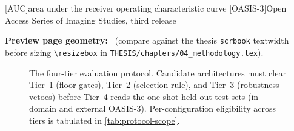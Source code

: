 \documentclass[fontsize=11pt,paper=a4]{scrbook}
\newcommand{\bg}{black}
\newcommand{\fg}{white}
\newcommand{\bg}{white}
\newcommand{\fg}{black}
\begin{document}
\pagecolor{\bg}
\color{\fg}

\begin{acronym}
  [AUC]{area under the receiver operating characteristic curve}
  [OASIS-3]{Open Access Series of Imaging Studies, third release}
\end{acronym}

\noindent\textbf{Preview page geometry:} \the\textwidth\ (compare against the thesis
\texttt{scrbook} textwidth before sizing \texttt{\textbackslash resizebox} in
\texttt{THESIS/chapters/04\_methodology.tex}).

\begin{figure}[p]
  \centering
  \resizebox{0.86\textwidth}{!}{}
  \caption{The four-tier evaluation protocol. Candidate architectures must clear
    Tier~1 (floor gates), Tier~2 (selection rule), and Tier~3 (robustness vetoes)
    before Tier~4 reads the one-shot held-out test sets (in-domain and external
    OASIS-3). Per-configuration eligibility across tiers is tabulated in
    \autoref{tab:protocol-scope}.}
  \label{fig:protocol-funnel}
\end{figure}
\end{document}
